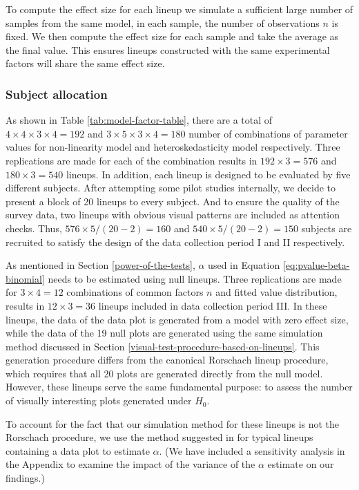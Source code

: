 \documentclass[]{interact}
\theoremstyle{plain}%
\theoremstyle{definition}
\theoremstyle{remark}
\begin{document}
To compute the effect size for each lineup we simulate a sufficient
large number of samples from the same model, in each sample, the number
of observations \(n\) is fixed. We then compute the effect size for each
sample and take the average as the final value. This ensures lineups
constructed with the same experimental factors will share the same
effect size.

\hypertarget{subject-allocation}{%
\subsubsection{Subject allocation}\label{subject-allocation}}

As shown in Table \ref{tab:model-factor-table}, there are a total of
\(4 \times 4 \times 3 \times 4 = 192\) and
\(3 \times 5 \times 3 \times 4 = 180\) number of combinations of
parameter values for non-linearity model and heteroskedasticity model
respectively. Three replications are made for each of the combination
results in \(192 \times 3 = 576\) and \(180 \times 3 = 540\) lineups. In
addition, each lineup is designed to be evaluated by five different
subjects. After attempting some pilot studies internally, we decide to
present a block of 20 lineups to every subject. And to ensure the
quality of the survey data, two lineups with obvious visual patterns are
included as attention checks. Thus, \(576 \times 5 / (20-2) = 160\) and
\(540 \times 5 / (20-2) = 150\) subjects are recruited to satisfy the
design of the data collection period I and II respectively.

As mentioned in Section \ref{power-of-the-tests}, \(\alpha\) used in
Equation \ref{eq:pvalue-beta-binomial} needs to be estimated using null
lineups. Three replications are made for \(3 \times 4 = 12\)
combinations of common factors \(n\) and fitted value distribution,
results in \(12 \times 3 = 36\) lineups included in data collection
period III. In these lineups, the data of the data plot is generated
from a model with zero effect size, while the data of the 19 null plots
are generated using the same simulation method discussed in Section
\ref{visual-test-procedure-based-on-lineups}. This generation procedure
differs from the canonical Rorschach lineup procedure, which requires
that all 20 plots are generated directly from the null model. However,
these lineups serve the same fundamental purpose: to assess the number
of visually interesting plots generated under \(H_0\).

To account for the fact that our simulation method for these lineups is
not the Rorschach procedure, we use the method suggested in
\citet{vanderplas2021statistical} for typical lineups containing a data
plot to estimate \(\alpha\). (We have included a sensitivity analysis in
the Appendix to examine the impact of the variance of the \(\alpha\)
estimate on our findings.)
\end{document}
